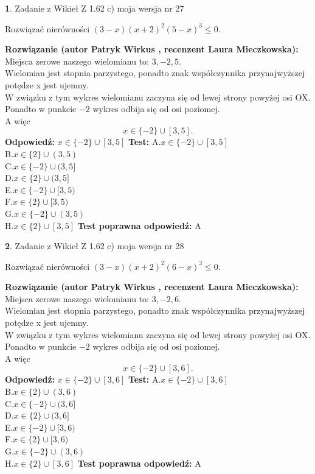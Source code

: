 \documentclass[12pt, a4paper]{article}
\theoremstyle{definition} %
\newtheorem{zad}{}
\newcommand{\zadStart}[1]{\begin{zad}#1\newline}
\newcommand{\zadStop}{\end{zad}}
\newcommand{\rozwStart}[2]{\noindent \textbf{Rozwiązanie (autor #1 , recenzent #2): }\newline}
\newcommand{\rozwStop}{\newline}
\newcommand{\odpStart}{\noindent \textbf{Odpowiedź:}\newline}
\newcommand{\odpStop}{\newline}
\newcommand{\testStart}{\noindent \textbf{Test:}\newline}
\newcommand{\testStop}{\newline}
\newcommand{\kluczStart}{\noindent \textbf{Test poprawna odpowiedź:}\newline}
\newcommand{\kluczStop}{\newline}
\begin{document}
\zadStart{Zadanie z Wikieł Z 1.62 c) moja wersja nr 27}

Rozwiązać nierówności $(3-x)(x+2)^{2}(5-x)^{3}\le0$.
\zadStop
\rozwStart{Patryk Wirkus}{Laura Mieczkowska}
Miejsca zerowe naszego wielomianu to: $3, -2, 5$.\\
Wielomian jest stopnia parzystego, ponadto znak współczynnika przy\linebreak najwyższej potędze x jest ujemny.\\ W związku z tym wykres wielomianu zaczyna się od lewej strony powyżej osi OX.\\
Ponadto w punkcie $-2$ wykres odbija się od osi poziomej.\\
A więc $$x \in \{-2\} \cup [3,5].$$
\rozwStop
\odpStart
$x \in \{-2\} \cup [3,5]$
\odpStop
\testStart
A.$x \in \{-2\} \cup [3,5]$\\
B.$x \in \{2\} \cup (3,5)$\\
C.$x \in \{-2\} \cup (3,5]$\\
D.$x \in \{2\} \cup (3,5]$\\
E.$x \in \{-2\} \cup [3,5)$\\
F.$x \in \{2\} \cup [3,5)$\\
G.$x \in \{-2\} \cup (3,5)$\\
H.$x \in \{2\} \cup [3,5]$
\testStop
\kluczStart
A
\kluczStop



\zadStart{Zadanie z Wikieł Z 1.62 c) moja wersja nr 28}

Rozwiązać nierówności $(3-x)(x+2)^{2}(6-x)^{3}\le0$.
\zadStop
\rozwStart{Patryk Wirkus}{Laura Mieczkowska}
Miejsca zerowe naszego wielomianu to: $3, -2, 6$.\\
Wielomian jest stopnia parzystego, ponadto znak współczynnika przy\linebreak najwyższej potędze x jest ujemny.\\ W związku z tym wykres wielomianu zaczyna się od lewej strony powyżej osi OX.\\
Ponadto w punkcie $-2$ wykres odbija się od osi poziomej.\\
A więc $$x \in \{-2\} \cup [3,6].$$
\rozwStop
\odpStart
$x \in \{-2\} \cup [3,6]$
\odpStop
\testStart
A.$x \in \{-2\} \cup [3,6]$\\
B.$x \in \{2\} \cup (3,6)$\\
C.$x \in \{-2\} \cup (3,6]$\\
D.$x \in \{2\} \cup (3,6]$\\
E.$x \in \{-2\} \cup [3,6)$\\
F.$x \in \{2\} \cup [3,6)$\\
G.$x \in \{-2\} \cup (3,6)$\\
H.$x \in \{2\} \cup [3,6]$
\testStop
\kluczStart
A
\kluczStop
\end{document}
